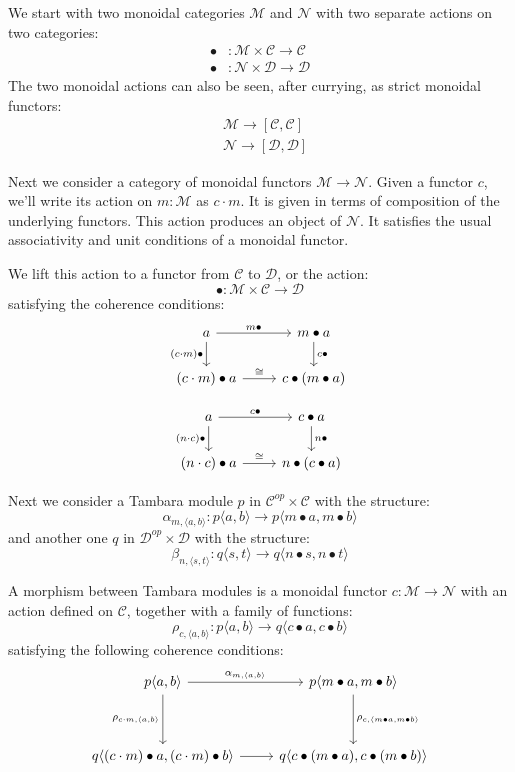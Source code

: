 \documentclass[11pt]{amsart}
\newcommand{\cat}[1]{\mathcal{#1}}%
\begin{document}
We start with two monoidal categories $\cat M$ and $\cat N$ with two separate actions on two categories:
\begin{align*} 
\bullet &\colon \cat M \times \cat C \to \cat C 
\\
 \bullet &\colon \cat N \times \cat D \to \cat D 
\end{align*}
The two monoidal actions can also be seen, after currying, as strict monoidal functors:
\begin{align*}
&\cat M \to [\cat C, \cat C]
\\
&\cat N \to [\cat D, \cat D]
\end{align*}

Next we consider a category of monoidal functors $\cat M \to \cat N$. Given a functor $c$, we'll write its action on $m \colon \cat M$ as $c \cdot m$. It is given in terms of composition of the underlying functors. This action produces an object of $\cat N$. It satisfies the usual associativity and unit conditions of a monoidal functor. 

We lift this action to a functor from $\cat C$ to  $\cat D$, or the action:
\[ \bullet \colon \cat M \times \cat C \to \cat D \]
satisfying the coherence conditions:
\[
 \begin{tikzcd}
 a
 \arrow [r, "m \bullet"] 
 \arrow [d, "(c \cdot m) \bullet"']
 & m \bullet a
 \arrow [d, "c \bullet"]
 \\
 (c \cdot m) \bullet a
 \arrow [r, "\cong"]
 & c \bullet (m \bullet a)
 \end{tikzcd}
\]

\[
 \begin{tikzcd}
 a
 \arrow [r, "c \bullet"] 
 \arrow [d, "(n \cdot c) \bullet"']
 & c \bullet a
 \arrow [d, "n \bullet"]
 \\
 (n \cdot c) \bullet a
 \arrow [r, "\cong"]
 & n \bullet (c \bullet a)
 \end{tikzcd}
\]

Next we consider a Tambara module $p$ in $\cat C^{op} \times \cat C$ with the structure:
\[ \alpha_{m, \langle a, b \rangle} \colon p \langle a, b \rangle \to p \langle m \bullet a, m \bullet b \rangle \]
and another one $q$ in $\cat D^{op} \times \cat D$  with the structure:
\[ \beta_{n, \langle s, t \rangle} \colon q \langle s, t \rangle \to q \langle n \bullet s, n \bullet t \rangle \]

A morphism between Tambara modules is a monoidal functor $c \colon \cat M \to \cat N$ with an action defined on $\cat C$, together with a family of functions:
\[ \rho_{c, \langle a, b \rangle} \colon p \langle a, b \rangle \to q \langle c \bullet a, c \bullet b \rangle \]
satisfying the following coherence conditions:
\[
 \begin{tikzcd}
 p \langle a, b \rangle
 \arrow[r, "{\alpha_{m, \langle a, b \rangle}}"]
 \arrow[dd, "{\rho_{c \cdot m, \langle a, b \rangle}}"']
& p \langle m \bullet a, m \bullet b \rangle
 \arrow[dd, "{\rho_{c, \langle m \bullet a, m \bullet b \rangle}}"]
 \\
  \\
 q \langle (c \cdot m)  \bullet a, (c \cdot m) \bullet b \rangle
 \arrow[r, ""]
& q \langle c \bullet (m \bullet a), c \bullet (m \bullet b) \rangle
 \end{tikzcd}
\]
\end{document}
